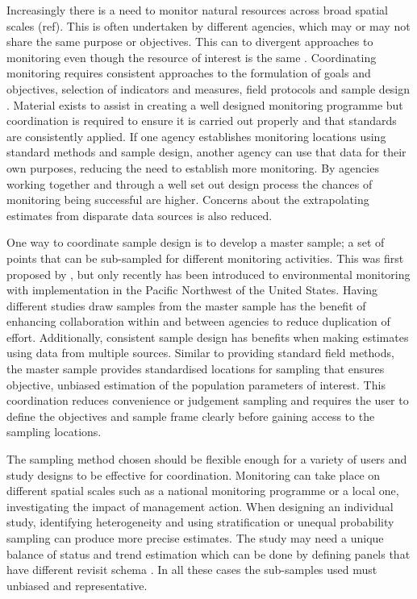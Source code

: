 \documentclass[titlepage]{article}
\begin{document}
Increasingly there is a need to monitor natural resources across broad spatial scales (ref). This is often undertaken by different agencies, which may or may not share the same purpose or objectives. This can to divergent approaches to monitoring even though the resource of interest is the same \citep{LarsenOlsenStevens2008}. Coordinating monitoring requires consistent approaches to the formulation of goals and objectives, selection of indicators and measures, field protocols and sample design \citep{fancy2009monitoring, LarsenOlsenStevens2008}. Material exists to assist in creating a well designed monitoring programme \citep{Gitzen2012, Reynolds2016, Vos2000} but coordination is required to ensure it is carried out properly and that standards are consistently applied. If one agency establishes monitoring locations using standard methods and sample design, another agency can use that data for their own purposes, reducing the need to establish more monitoring. By agencies working together and through a well set out design process the chances of monitoring being successful are higher. Concerns about the extrapolating estimates from disparate data sources is also reduced.

One way to coordinate sample design is to develop a master sample; a set of points that can be sub-sampled for different monitoring activities. This was first proposed by \citep{King1945}, but only recently has been introduced to environmental monitoring \citep{LarsenOlsenStevens2008, theobald2016} with implementation in the Pacific Northwest of the United States. Having different studies draw samples from the master sample has the benefit of enhancing collaboration within and between agencies to reduce duplication of effort. Additionally, consistent sample design has benefits when making estimates using data from multiple sources. Similar to providing standard field methods, the master sample provides standardised locations for sampling that ensures objective, unbiased estimation of the population parameters of interest. This coordination reduces convenience or judgement sampling and requires the user to define the objectives and sample frame clearly before gaining access to the sampling locations. 

The sampling method chosen should be flexible enough for a variety of users and study designs to be effective for coordination. Monitoring can take place on different spatial scales such as a national monitoring programme or a local one, investigating the impact of management action. When designing an individual study, identifying heterogeneity and using stratification \citep{Yoccoz2001} or unequal probability sampling \citep{Stevens1997} can produce more precise estimates. The study may need a unique balance of status and trend estimation which can be done by defining panels that have different revisit schema \citep{Skalski1990, Mcdonald2003, StevensOlsen1999}. In all these cases the sub-samples used must unbiased and representative.
\end{document}
